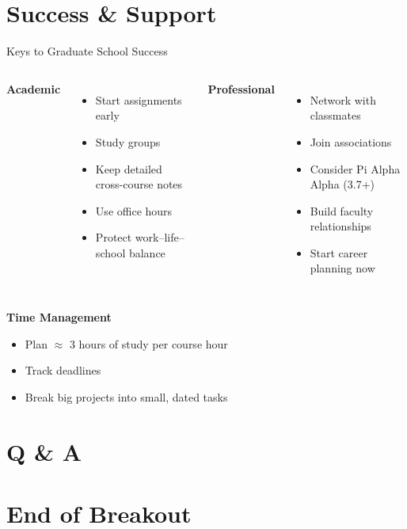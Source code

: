 \documentclass[10pt]{beamer}
\begin{document}
\section{\textcolor{titanorange}{Success \& Support}}
\begin{frame}{Keys to Graduate School Success}
\begin{columns}[T,onlytextwidth]
  \textbf{Academic}
  \begin{itemize}
    \item Start assignments early
    \item Study groups
    \item Keep detailed cross-course notes
    \item Use office hours
    \item Protect work--life--school balance
  \end{itemize}
  \textbf{Professional}
  \begin{itemize}
    \item Network with classmates
    \item Join associations
    \item Consider Pi Alpha Alpha (3.7+)
    \item Build faculty relationships
    \item Start career planning now
  \end{itemize}
\end{columns}

\vspace{0.4em}
\textbf{Time Management}
\begin{itemize}
  \item Plan \(\approx\) 3 hours of study per course hour
  \item Track deadlines
  \item Break big projects into small, dated tasks
\end{itemize}
\end{frame}

\section{\textcolor{titanorange}{Q \& A}}


\section{\textcolor{titanorange}{End of Breakout}}
\end{document}
